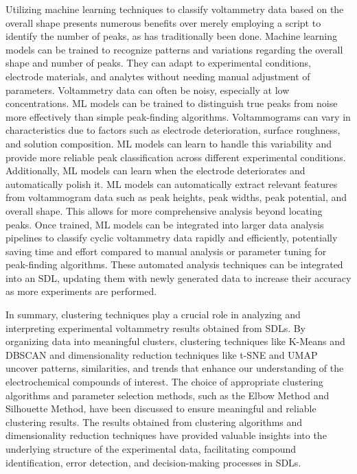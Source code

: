 Utilizing machine learning techniques to classify voltammetry data based on the overall shape presents numerous benefits over merely employing a script to identify the number of peaks, as has traditionally been done. Machine learning models can be trained to recognize patterns and variations regarding the overall shape and number of peaks. They can adapt to experimental conditions, electrode materials, and analytes without needing manual adjustment of parameters. Voltammetry data can often be noisy, especially at low concentrations. ML models can be trained to distinguish true peaks from noise more effectively than simple peak-finding algorithms. Voltammograms can vary in characteristics due to factors such as electrode deterioration, surface roughness, and solution composition. ML models can learn to handle this variability and provide more reliable peak classification across different experimental conditions. Additionally, ML models can learn when the electrode deteriorates and automatically polish it. ML models can automatically extract relevant features from voltammogram data such as peak heights, peak widths, peak potential, and overall shape. This allows for more comprehensive analysis beyond locating peaks. Once trained, ML models can be integrated into larger data analysis pipelines to classify cyclic voltammetry data rapidly and efficiently, potentially saving time and effort compared to manual analysis or parameter tuning for peak-finding algorithms. These automated analysis techniques can be integrated into an SDL, updating them with newly generated data to increase their accuracy as more experiments are performed.

In summary, clustering techniques play a crucial role in analyzing and interpreting experimental voltammetry results obtained from SDLs. By organizing data into meaningful clusters, clustering techniques like K-Means and DBSCAN and dimensionality reduction techniques like t-SNE and UMAP uncover patterns, similarities, and trends that enhance our understanding of the electrochemical compounds of interest. The choice of appropriate clustering algorithms and parameter selection methods, such as the Elbow Method and Silhouette Method, have been discussed to ensure meaningful and reliable clustering results. The results obtained from clustering algorithms and dimensionality reduction techniques have provided valuable insights into the underlying structure of the experimental data, facilitating compound identification, error detection, and decision-making processes in SDLs.